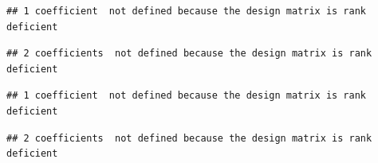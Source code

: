 \documentclass[
]{article}
\begin{document}
\begin{verbatim}
## 1 coefficient  not defined because the design matrix is rank deficient
\end{verbatim}

\begin{verbatim}
## 2 coefficients  not defined because the design matrix is rank deficient
\end{verbatim}

\begin{verbatim}
## 1 coefficient  not defined because the design matrix is rank deficient
\end{verbatim}

\begin{verbatim}
## 2 coefficients  not defined because the design matrix is rank deficient
\end{verbatim}
\end{document}
